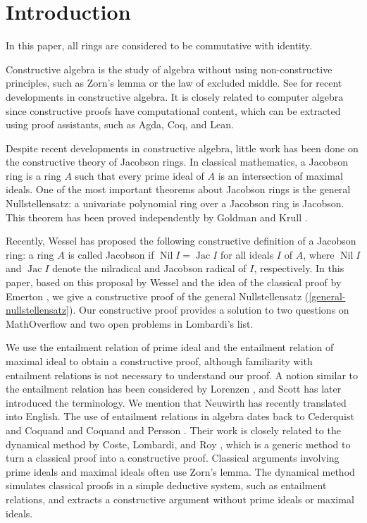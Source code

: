\documentclass[11pt]{article}
\theoremstyle{definition}
\DeclareMathOperator{\Nil}{Nil}
\DeclareMathOperator{\Jac}{Jac}
\begin{document}
\section{Introduction}
In this paper, all rings are considered to be commutative with identity.

Constructive algebra is the study of algebra without using non-constructive principles, such as Zorn's lemma or the law of excluded middle.
See \cite{MRR88,LQ15,Yen15,CL24} for recent developments in constructive algebra.
It is closely related to computer algebra since constructive proofs have computational content, which can be extracted using proof assistants, such as Agda, Coq, and Lean.

Despite recent developments in constructive algebra, little work has been done on the constructive theory of Jacobson rings.
In classical mathematics, a Jacobson ring is a ring $A$ such that every prime ideal of $A$ is an intersection of maximal ideals.
One of the most important theorems about Jacobson rings is the general Nullstellensatz: a univariate polynomial ring over a Jacobson ring is Jacobson. This theorem has been proved independently by Goldman \cite[Theorem 3]{Gol51} and Krull \cite[Satz 1]{Kru51}.

Recently, Wessel \cite[Section 2.4.1]{Wes18} has proposed the following constructive definition of a Jacobson ring: a ring $A$ is called Jacobson if $\Nil I=\Jac I$ for all ideals $I$ of $A$, where $\Nil I$ and $\Jac I$ denote the nilradical and Jacobson radical of $I$, respectively.
In this paper, based on this proposal by Wessel and the idea of the classical proof by Emerton \cite[Theorem 8]{Eme}, we give a constructive proof of the general Nullstellensatz (\cref{general-nullstellensatz}).
Our constructive proof provides a solution to two questions \cite{Wer17,Arr21} on MathOverflow and two open problems \cite[{}1.1, 1.2]{Lom23} in Lombardi's list.

We use the entailment relation of prime ideal and the entailment relation of maximal ideal \cite{SW21} to obtain a constructive proof, although familiarity with entailment relations is not necessary to understand our proof.
A notion similar to the entailment relation has been considered by Lorenzen \cite{Lor51}, and Scott \cite{Sco71,Sco74} has later introduced the terminology.
We mention that Neuwirth \cite{Lor25} has recently translated \cite{Lor51} into English.
The use of entailment relations in algebra dates back to Cederquist and Coquand \cite{CC00} and Coquand and Persson \cite{CP01}. Their work is closely related to the dynamical method by Coste, Lombardi, and Roy \cite{CLR01}, which is a generic method to turn a classical proof into a constructive proof.
Classical arguments involving prime ideals and maximal ideals often use Zorn's lemma.
The dynamical method simulates classical proofs in a simple deductive system, such as entailment relations, and extracts a constructive argument without prime ideals or maximal ideals.
\end{document}
